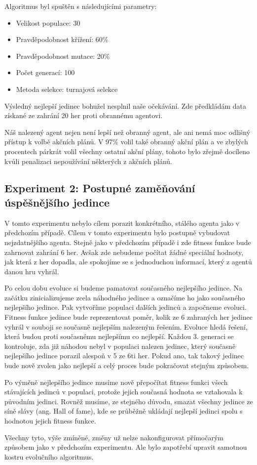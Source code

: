Algoritmus byl spuštěn s následujícími parametry:
\begin{itemize}
    \item Velikost populace: 30
    \item Pravděpodobnost křížení: 60\%
    \item Pravděpodobnost mutace: 20\%
    \item Počet generací: 100
    \item Metoda selekce: turnajová selekce
\end{itemize}

Výsledný nejlepší jedinec bohužel nesplnil naše očekávání. Zde předkládám data získané ze zahrání 20 her proti obrannému agentovi.

Náš nalezený agent nejen není lepší než obranný agent, ale ani nemá moc odlišný přístup k volbě akčních plánů. 
V 97\% volil také obranný akční plán a ve zbylých procentech párkrát volil všechny ostatní akční plány, tohoto bylo zřejmě docíleno kvůli penalizaci nepoužívání některých z akčních plánů.






\subsection{Experiment 2: Postupné zaměňování úspěšnějšího jedince}
V tomto experimentu nebylo cílem porazit konkrétního, stálého agenta jako v předchozím případě.
Cílem v tomto experimentu bylo postupně vybudovat nejzdatnějšího agenta.
Stejně jako v předchozím případě i zde fitness funkce bude zahrnovat zahrání 6 her. 
Avšak zde nebudeme počítat žádné speciální hodnoty, jak která z her dopadla, ale spokojíme se s jednoduchou informací, který z agentů danou hru vyhrál.
\par
Po celou dobu evoluce si budeme pamatovat současného nejlepšího jedince. 
Na začátku zinicializujeme zcela náhodného jedince a označíme ho jako současného nejlepšího jedince.
Pak vytvoříme populaci dalších jedinců a započneme evoluci.
Fitness funkce jedince bude reprezentovat poměr, kolik ze 6 zahraných her jedinec vyhrál v souboji se současně nejlepším nalezeným řešením.
Evoluce hledá řešení, která budou proti současnému nejlepšímu co nejlepší.
Každou 3. generaci se kontroluje, zda již náhodou nebyl v populaci nalezen jedinec, který současně nejlepšího jedince porazil alespoň v 5 ze 6ti her.
Pokud ano, tak takový jedinec bude nově zvolen jako nejlepší a celý proces bude pokračovat stejným způsobem.
\par
Po výměně nejlepšího jedince musíme nově přepočítat fitness funkci všech stávajících jedinců v populaci, protože jejich současná hodnota se vztahovala k původním jedinci.
Rovněž musíme, ze stejného důvodu, smazat všechny jedince ze síně slávy (ang. Hall of fame), kde se průběžně ukládají nejlepší jedinci spolu s hodnotou jejich fitness funkce.
\par
Všechny tyto, výše zmíněné, změny už nelze nakonfigurovat přímočarým způsobem jako v předchozím experimentu. 
Ale bylo zapotřebí upravit samotnou kostru evolučního algoritmus.




